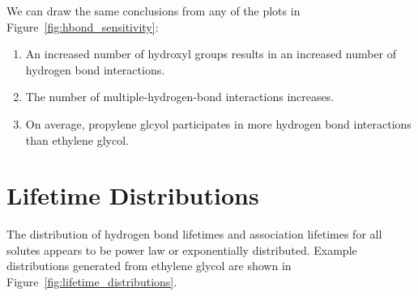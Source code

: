 \documentclass{article}
\begin{document}
  We can draw the same conclusions from any of the plots in Figure~\ref{fig:hbond_sensitivity}:
  \begin{enumerate}
    \item An increased number of hydroxyl groups results in an increased number of hydrogen bond
    interactions.
    \item The number of multiple-hydrogen-bond interactions increases.
    \item On average, propylene glcyol participates in more hydrogen bond interactions than 
    ethylene glycol.  %
  \end{enumerate}
  
  \section{Lifetime Distributions}\label{section:lifetime_distributions}
  
  The distribution of hydrogen bond lifetimes and association lifetimes
  for all solutes appears to be power law or exponentially distributed. 
  Example distributions generated from ethylene glycol are shown in
  Figure~\ref{fig:lifetime_distributions}. 
  
\end{document}
